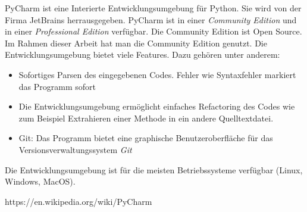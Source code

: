 PyCharm ist eine Interierte Entwicklungsumgebung für Python. Sie wird von der Firma JetBrains herrausgegeben. PyCharm ist in einer \textit{Community Edition} und in einer \textit{Professional Edition} verfügbar. Die Community Edition ist Open Source. Im Rahmen dieser Arbeit hat man die Community Edition genutzt. Die Entwicklungsumgebung bietet viele Features. Dazu gehören unter anderem:
\begin{itemize}
\item Sofortiges Parsen des eingegebenen Codes. Fehler wie Syntaxfehler markiert das Programm sofort
\item Die Entwicklungsumgebung ermöglicht einfaches Refactoring des Codes wie zum Beispiel Extrahieren einer Methode in ein andere Quelltextdatei.
\item Git: Das Programm bietet eine graphische Benutzeroberfläche für das Versionsverwaltungssystem \textit{Git} 
\end{itemize} 
Die Entwicklungsumgebung ist für die meisten Betriebssysteme verfügbar (Linux, Windows, MacOS).


https://en.wikipedia.org/wiki/PyCharm 
\cite{dembowski2015raspberry}





          
 
